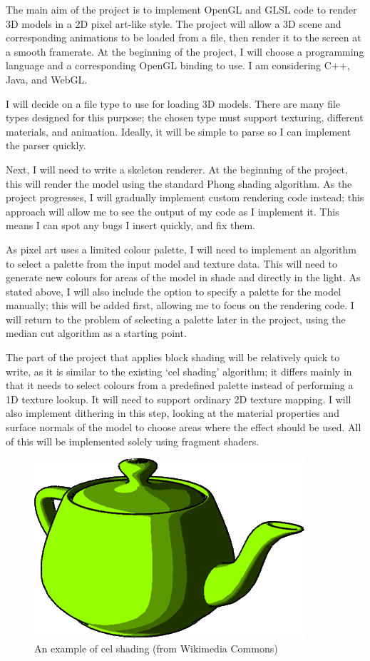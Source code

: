 \documentclass[12pt]{article}
\begin{document}
The main aim of the project is to implement OpenGL and GLSL code to render 3D models in a 2D pixel art-like style. The project will allow a 3D scene and corresponding animations to be loaded from a file, then render it to the screen at a smooth framerate. At the beginning of the project, I will choose a programming language and a corresponding OpenGL binding to use. I am considering C++, Java, and WebGL.

I will decide on a file type to use for loading 3D models. There are many file types designed for this purpose; the chosen type must support texturing, different materials, and animation. Ideally, it will be simple to parse so I can implement the parser quickly.

Next, I will need to write a skeleton renderer. At the beginning of the project, this will render the model using the standard Phong shading algorithm. As the project progresses, I will gradually implement custom rendering code instead; this approach will allow me to see the output of my code as I implement it. This means I can spot any bugs I insert quickly, and fix them.

As pixel art uses a limited colour palette, I will need to implement an algorithm to select a palette from the input model and texture data. This will need to generate new colours for areas of the model in shade and directly in the light. As stated above, I will also include the option to specify a palette for the model manually; this will be added first, allowing me to focus on the rendering code. I will return to the problem of selecting a palette later in the project, using the median cut algorithm as a starting point.

The part of the project that applies block shading will be relatively quick to write, as it is similar to the existing `cel shading' algorithm; it differs mainly in that it needs to select colours from a predefined palette instead of performing a 1D texture lookup. It will need to support ordinary 2D texture mapping. I will also implement dithering in this step, looking at the material properties and surface normals of the model to choose areas where the effect should be used. All of this will be implemented solely using fragment shaders.

\begin{figure}[h!]
\centering
\includegraphics{celshading}
\caption{An example of cel shading (from Wikimedia Commons)}
\end{figure}
\end{document}
